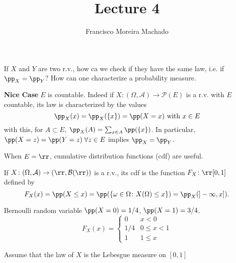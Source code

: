 \documentclass[../main.tex]{subfiles}
\author{Francisco Moreira Machado}
\title{Lecture 4}
\begin{document}
If $X$ and $Y$ are two r.v., how ca we check if they have the same law, i.e. if $\pp_X =
\pp_Y$?
How can one characterize a probability measure.

\vspace{0.8em}
\noindent
\textbf{\sffamily Nice Case} $E$ is countable. Indeed if $X \colon (\Omega, \mathcal{A})
\to \mathcal{P}(E)$ is a r.v. with $E$ countable, its law is characterized by the values
$$\pp_{X}(x) = \pp_X(\{ x \}) = \pp(X = x) \text { with } x \in E$$
with this, for $A \subset E$, $\pp_X(A) = \sum_{x \in A} \pp(\{ x \})$.
In particular, $\pp(X = z) = \pp(Y = z) \;\forall z \in E$ implies $\pp_X = \pp_Y$.

\vspace{1em}

When $E = \rr$, cumulative distribution functions (cdf) are useful.

\begin{definition}
  [cdf]
  If $X \colon (\Omega, \mathcal{A}) \to (\rr, \mathcal{B}(\rr))$ is a r.v., its cdf is the
  function $F_X \colon \rr [0, 1]$ defined by 
  \[
    F_X(x) = \pp(X \leq x) = \pp(\{ \omega \in \Omega \colon X(\Omega) \leq x\}) = \pp_X(]
    -\infty, x])
  .\]
\end{definition}
\newpage

\begin{example}
    Bernoulli random variable $\pp(X = 0) = 1/4$, $\pp(X = 1) = 3/4$.
    \[
    F_X(x) = \begin{cases}
      0 & x < 0 \\
      1/4 & 0 \leq x < 1 \\
      1 & 1 \leq x
    \end{cases}
    \] 
\end{example}

\begin{example}
  Assume that the law of $X$ is the Lebesgue measure on $[0, 1]$
\end{example}
\end{document}
